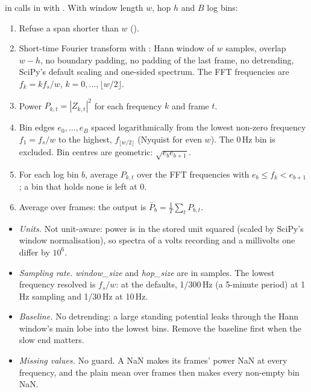  in  calls  in
 with . With window
length $w$, hop $h$ and $B$ log bins:
\begin{enumerate}
\item Refuse a span shorter than $w$ ().
\item Short-time Fourier transform with 
  \citep{virtanen2020scipy}: Hann window of $w$ samples, overlap $w-h$, no boundary
  padding, no padding of the last frame, no detrending, SciPy's default scaling and
  one-sided spectrum. The FFT frequencies are $f_k = k f_s/w$, $k = 0,\dots,\lfloor w/2\rfloor$.
\item Power $P_{k,t} = |Z_{k,t}|^2$ for each frequency $k$ and frame $t$.
\item Bin edges $e_0,\dots,e_B$ spaced logarithmically from the lowest non-zero frequency
  $f_1 = f_s/w$ to the highest, $f_{\lfloor w/2\rfloor}$ (Nyquist for even $w$). The
  0\,Hz bin is excluded. Bin centres are geometric: $\sqrt{e_b e_{b+1}}$.
\item For each log bin $b$, average $P_{k,t}$ over the FFT frequencies with
  $e_b \leq f_k < e_{b+1}$; a bin that holds none is left at 0.
\item Average over frames: the output is $\bar P_b = \frac{1}{T}\sum_t P_{b,t}$.
\end{enumerate}

\begin{itemize}
\item \emph{Units.} Not unit-aware: power is in the stored unit squared (scaled by SciPy's
  window normalisation), so spectra of a volts recording and a millivolts one differ by
  $10^6$.
\item \emph{Sampling rate.} \emph{window\_size} and \emph{hop\_size} are in samples. The
  lowest frequency resolved is $f_s/w$: at the defaults, 1/300\,Hz (a 5-minute period) at
  1\,Hz sampling and 1/30\,Hz at 10\,Hz.
\item \emph{Baseline.} No detrending: a large standing potential leaks through the Hann
  window's main lobe into the lowest bins. Remove the baseline first when the slow end
  matters.
\item \emph{Missing values.} No guard. A NaN makes its frames' power NaN at every frequency,
  and the plain mean over frames then makes every non-empty bin NaN.
\end{itemize}

